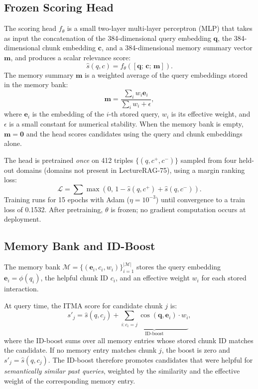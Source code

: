 \documentclass[journal]{IEEEtran}
\begin{document}
\subsection{Frozen Scoring Head}
\label{sec:head}
The scoring head $f_\theta$ is a small two-layer multi-layer perceptron
(MLP) that takes as input the concatenation of the 384-dimensional query
embedding $\mathbf{q}$, the 384-dimensional chunk embedding $\mathbf{c}$,
and a 384-dimensional memory summary vector $\mathbf{m}$, and produces a
scalar relevance score:
\begin{equation}
\hat{s}(q, c) = f_\theta([\mathbf{q};\,\mathbf{c};\,\mathbf{m}]).
\label{eq:head}
\end{equation}
The memory summary $\mathbf{m}$ is a weighted average of the query
embeddings stored in the memory bank:
\begin{equation}
\mathbf{m} = \frac{\sum_{i} w_i \mathbf{e}_i}{\sum_{i} w_i + \epsilon},
\label{eq:summary}
\end{equation}
where $\mathbf{e}_i$ is the embedding of the $i$-th stored query, $w_i$ is
its effective weight, and $\epsilon$ is a small constant for numerical
stability.  When the memory bank is empty, $\mathbf{m}=\mathbf{0}$ and the
head scores candidates using the query and chunk embeddings alone.

The head is pretrained \emph{once} on 412 triples $\{(q, c^+, c^-)\}$
sampled from four held-out domains (domains not present in LectureRAG-75),
using a margin ranking loss:
\begin{equation}
\mathcal{L} = \sum \max(0,\,1 - \hat{s}(q,c^+) + \hat{s}(q,c^-)).
\label{eq:loss}
\end{equation}
Training runs for 15 epochs with Adam ($\eta=10^{-3}$) until convergence
to a train loss of 0.1532.  After pretraining, $\theta$ is frozen; no
gradient computation occurs at deployment.

\subsection{Memory Bank and ID-Boost}
\label{sec:memory}
The memory bank
$\mathcal{M} = \{(\mathbf{e}_i, c_i, w_i)\}_{i=1}^{|\mathcal{M}|}$
stores the query embedding $\mathbf{e}_i = \phi(q_i)$, the helpful chunk
ID $c_i$, and an effective weight $w_i$ for each stored interaction.

At query time, the ITMA score for candidate chunk $j$ is:
\begin{equation}
s'_j = \hat{s}(q, c_j)
  + \underbrace{\sum_{i\colon c_i = j}
    \cos(\mathbf{q}, \mathbf{e}_i) \cdot w_i}_{\text{ID-boost}},
\label{eq:boost}
\end{equation}
where the ID-boost sums over all memory entries whose stored chunk ID
matches the candidate.  If no memory entry matches chunk $j$, the boost
is zero and $s'_j = \hat{s}(q, c_j)$.  The ID-boost therefore promotes
candidates that were helpful for \emph{semantically similar past queries},
weighted by the similarity and the effective weight of the corresponding
memory entry.
\end{document}
